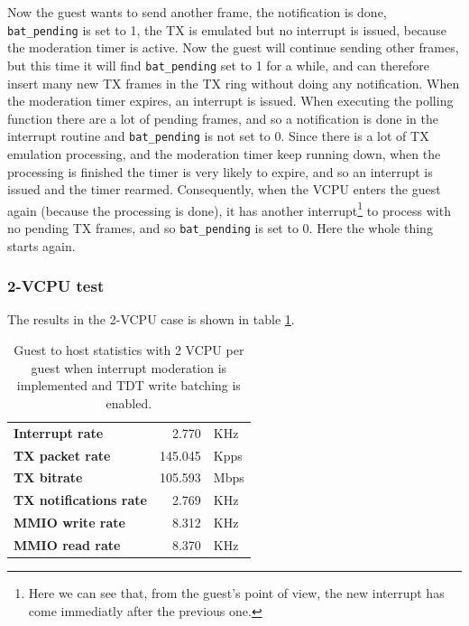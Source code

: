 Now the guest wants to send another frame, the notification is done, \texttt{bat\_pending} is set to 1, the TX is emulated but no
interrupt is issued, because the moderation timer is active. Now the guest will continue sending other frames, but this time it will
find \texttt{bat\_pending} set to 1 for a while, and can therefore insert many new TX frames in the TX ring without doing any notification.
When the moderation timer expires, an interrupt is issued. When executing the polling function there are a lot of pending frames, and
so a notification is done in the interrupt routine and \texttt{bat\_pending} is not set to 0. Since there is a lot of TX emulation 
processing,
and the moderation timer keep running down, when the processing is finished the timer is very likely to expire, and so an interrupt is
issued and the timer rearmed. Consequently, when the VCPU enters the guest again (because the processing is done), it has another 
interrupt\footnote{Here we can see that, from the guest's point of view, the new interrupt has come immediatly after the previous one.} 
to process with no pending TX frames, and so \texttt{bat\_pending} is set to 0. Here the whole thing starts again.


\subsubsection{2-VCPU test}
The results in the 2-VCPU case is shown in table \ref{tab:e1000-mit-bat-tx-g2h2vcpu}.

\begin{table}
\begin{center}
\begin{tabular}{lrl}
\toprule
\textbf{Interrupt rate} & 2.770 & KHz\\
\textbf{TX packet rate} & 145.045 & Kpps\\
\textbf{TX bitrate} & 105.593 & Mbps\\
\textbf{TX notifications rate} & 2.769 & KHz\\
\textbf{MMIO write rate} & 8.312 & KHz\\
\textbf{MMIO read rate} & 8.370 & KHz\\
\bottomrule
\end{tabular}
\end{center}
\caption{Guest to host statistics with 2 VCPU per guest when interrupt moderation is implemented and TDT write batching is enabled.}
\label{tab:e1000-mit-bat-tx-g2h2vcpu}
\end{table}

